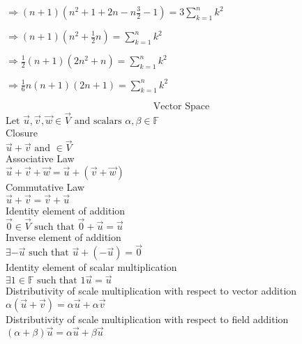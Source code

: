 \documentclass[10pt]{article}
\begin{document}
$\Rightarrow (n+1)( n^2+1+2n-n\frac{3}{2} - 1) = 3\sum_{k=1}^{n} k^2 $	

$\Rightarrow (n+1)(n^2 + \frac{1}{2}n) = \sum_{k=1}^{n} k^2$

$\Rightarrow \frac{1}{2}(n+1)(2n^2+n)=\sum_{k=1}^{n} k^2$

$\Rightarrow \frac{1}{6}n(n+1)(2n+1) = \sum_{k=1}^{n} k^2 $

\pagebreak
\[ \text{Vector Space} \]
$\text{Let }\vec{u}, \vec{v}, \vec{w} \in \vec{V} \text{ and scalars } \alpha, \beta \in \mathbb{F}$\\
Closure\\
$\vec{u} + \vec{v} \text{ and } \in \vec{V}$\\
Associative Law\\
$\vec{u} + \vec{v} + \vec{w} = \vec{u} + (\vec{v} + \vec{w})$\\
Commutative Law\\
$\vec{u} + \vec{v} = \vec{v} + \vec{u} $\\
Identity element of addition\\
$\vec{0} \in \vec{V} \text{ such that } \vec{0} + \vec{u} = \vec{u}$\\
Inverse element of addition\\
$\exists -\vec{u} \text{ such that } \vec{u} + (-\vec{u}) = \vec{0}$\\
Identity element of scalar multiplication\\
$\exists \mathit{1} \in \mathbb{F} \text{ such that } \mathit{1}\vec{u} = \vec{u}$\\
Distributivity of scale multiplication with respect to vector addition\\
$\alpha(\vec{u} + \vec{v}) = \alpha\vec{u} + \alpha\vec{v}$\\
Distributivity of scale multiplication with respect to field addition\\
$(\alpha + \beta)\vec{u} = \alpha\vec{u} + \beta\vec{u}$\\
\end{document}

